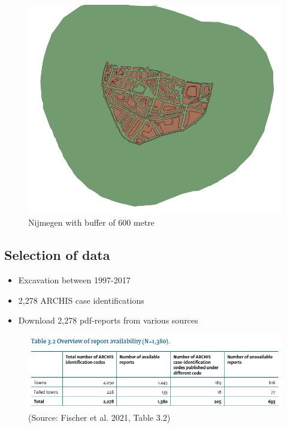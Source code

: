 \documentclass[
  letterpaper,
  DIV=11,
  numbers=noendperiod]{scrartcl}
\providecommand{\tightlist}{%
  \setlength{\itemsep}{0pt}\setlength{\parskip}{0pt}}\usepackage{longtable,booktabs,array}
\begin{document}
\begin{figure}

{\centering \includegraphics{images/Nijmegen_with_buffer.png}

}

\caption{Nijmegen with buffer of 600 metre}

\end{figure}

\hypertarget{selection-of-data}{%
\subsection{Selection of data}\label{selection-of-data}}

\begin{itemize}
\tightlist
\item
  Excavation between 1997-2017
\item
  2,278 ARCHIS case identifications
\item
  Download 2,278 pdf-reports from various sources
\end{itemize}

\begin{figure}

{\centering \includegraphics{images/Table_3.2.png}

}

\caption{(Source: Fischer et al. 2021, Table 3.2)}

\end{figure}
\end{document}
